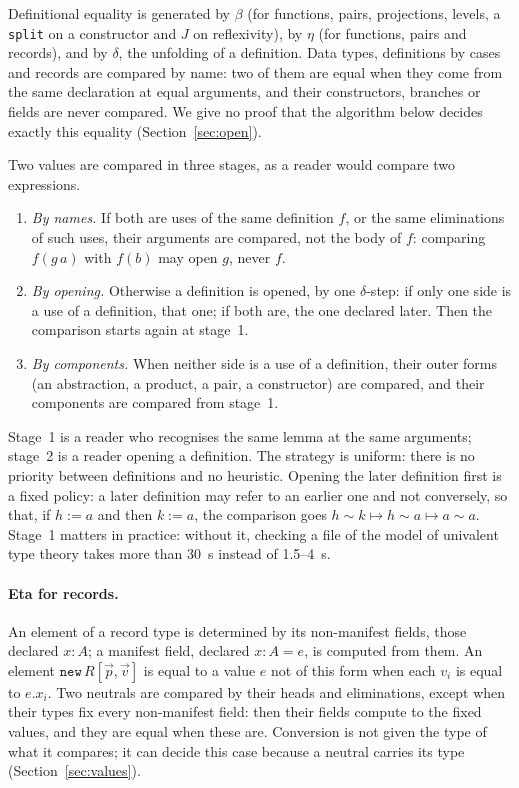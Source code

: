 \documentclass[11pt]{article}
\newcommand{\kw}[1]{\texttt{#1}}
\begin{document}
Definitional equality is generated by $\beta$ (for functions, pairs,
projections, levels, a \kw{split} on a constructor and $J$ on
reflexivity), by $\eta$ (for functions, pairs and records), and by
$\delta$, the unfolding of a definition. Data types, definitions by
cases and records are compared by name: two of them are equal when they
come from the same declaration at equal arguments, and their
constructors, branches or fields are never compared. We give no proof
that the algorithm below decides exactly this equality
(Section~\ref{sec:open}).

Two values are compared in three stages, as a reader would compare
two expressions.
\begin{enumerate}
\item \emph{By names.} If both are uses of the same definition $f$, or
  the same eliminations of such uses, their arguments are compared, not
  the body of $f$: comparing $f(g\,a)$ with $f(b)$ may open $g$, never
  $f$.
\item \emph{By opening.} Otherwise a definition is opened, by one
  $\delta$-step: if only one side is a use of a definition, that one; if
  both are, the one declared later. Then the comparison starts again
  at stage~1.
\item \emph{By components.} When neither side is a use of a definition,
  their outer forms (an abstraction, a product, a pair, a constructor)
  are compared, and their components are compared from stage~1.
\end{enumerate}
Stage~1 is a reader who recognises the same lemma at the same
arguments; stage~2 is a reader opening a definition. The strategy is
uniform: there is no priority between definitions and no heuristic.
Opening the later definition first is a fixed policy: a later definition
may refer to an earlier one and not conversely, so that, if $h:=a$ and
then $k:=a$, the comparison goes $h\sim k \mapsto h\sim a\mapsto a\sim a$.
Stage~1 matters in practice: without it, checking a file of the model
of univalent type theory takes more than 30~s instead of 1.5--4~s.

\paragraph{Eta for records.} An element of a record type is determined
by its non-manifest fields, those declared $x : A$; a manifest field,
declared $x : A = e$, is computed from them. An element
$\kw{new}\,R[\vec p,\vec v]$ is equal to a value $e$ not of this form
when each $v_i$ is equal to $e.x_i$. Two neutrals are compared by their
heads and eliminations, except when their types fix every non-manifest
field: then their fields compute to the fixed values, and they are equal
when these are. Conversion is not given the type of what it compares;
it can decide this case because a neutral carries its type
(Section~\ref{sec:values}).
\end{document}
